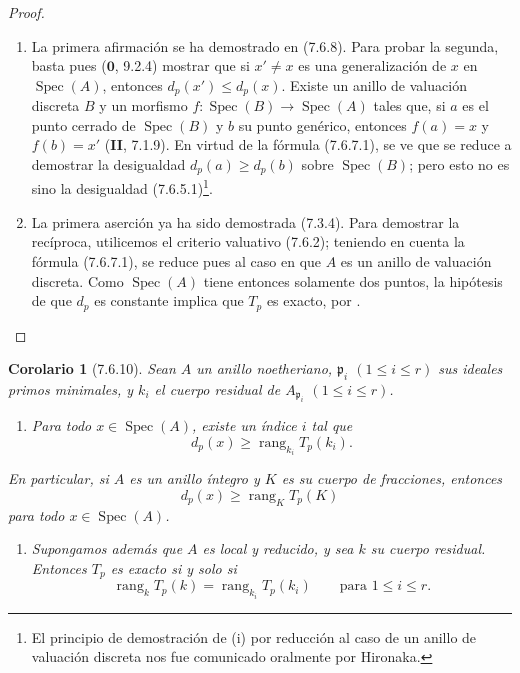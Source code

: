 \documentclass[10pt,oneside,openany]{book}
\theoremstyle{egaenv}\newtheorem*{env}{---}
\theoremstyle{egastatement}
\newtheorem*{corollary}{Corolario}
\theoremstyle{egadescription}
\newcommand{\oldpage}[2][]{\marginnote{\normalfont\scriptsize\textbf{#1}\,|\,#2}\ignorespaces}
\renewcommand{\leq}{\leqslant}
\renewcommand{\geq}{\geqslant}
\begin{document}
\begin{proof}
\begin{enumerate}
  \item[(i)] La primera afirmación se ha demostrado en (7.6.8). Para probar
    la segunda, basta pues ($\mathbf{0}$, 9.2.4) mostrar que si $x'\ne x$ es una generalización de $x$ en
$\operatorname{Spec}(A)$, entonces $d_p(x')\leq d_p(x)$. Existe un anillo de
valuación discreta $B$ y un morfismo
$f:\operatorname{Spec}(B)\longrightarrow\operatorname{Spec}(A)$
tales que, si $a$ es el punto cerrado de $\operatorname{Spec}(B)$ y $b$ su punto
genérico, entonces $f(a)=x$ y $f(b)=x'$ (\textbf{II}, 7.1.9). En virtud de la fórmula (7.6.7.1), se ve que se reduce a demostrar la desigualdad $d_p(a)\geq d_p(b)$ sobre $\operatorname{Spec}(B)$; pero esto no es sino la desigualdad (7.6.5.1)\footnote{El principio de demostración de (i) por reducción al caso de un anillo de valuación discreta nos fue comunicado oralmente por Hironaka.}.
\item[(ii)] La primera aserción ya ha sido demostrada (7.3.4). Para demostrar la recíproca, utilicemos el criterio valuativo (7.6.2); teniendo en cuenta la fórmula (7.6.7.1), se reduce pues al caso en que $A$ es un anillo
de valuación discreta. Como $\operatorname{Spec}(A)$ tiene entonces solamente dos
puntos, la hipótesis de que $d_p$ es constante implica que $T_p$ es
exacto, por .
\end{enumerate}
\end{proof}

\begin{corollary}[7.6.10]
\label{III.7.6.10}
Sean $A$ un anillo noetheriano, $\mathfrak p_i$ $(1\leq i\leq r)$
sus ideales primos minimales, y $k_i$ el cuerpo residual de
$A_{\mathfrak p_i}$
$(1\leq i\leq r)$.
\begin{enumerate}
  \item[\textup{(i)}] Para todo $x\in\operatorname{Spec}(A)$, existe un índice $i$ tal que
    \[
      d_p(x)\geq\operatorname{rang}_{k_i}T_p(k_i).
      \tag{7.6.10.1}\label{III.7.6.10.1.fr}
    \]
\end{enumerate}
En particular, si $A$ es un anillo íntegro y $K$ es su cuerpo de
fracciones, entonces
\[
  d_p(x)\geq\operatorname{rang}_K T_p(K)
  \tag{7.6.10.2}\label{III.7.6.10.2.fr}
\]
para todo $x\in\operatorname{Spec}(A)$.

\oldpage[III]{196}
\begin{enumerate}
  \item[\textup{(ii)}] Supongamos además que $A$ es local y reducido, y sea
    $k$ su cuerpo residual. Entonces $T_p$ es exacto si y solo si
    \[
      \operatorname{rang}_k T_p(k)
      =
      \operatorname{rang}_{k_i}T_p(k_i)
      \qquad\text{para }1\leq i\leq r.
      \tag{7.6.10.3}\label{III.7.6.10.3.fr}
    \]
\end{enumerate}
\end{corollary}
\end{document}

